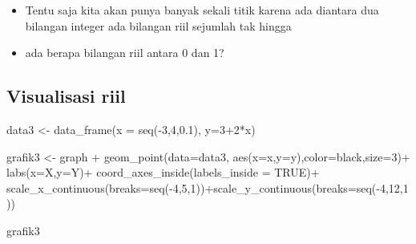 \documentclass[
  letterpaper,
  DIV=11,
  numbers=noendperiod]{scrartcl}
\newenvironment{Shaded}{\begin{snugshade}}{\end{snugshade}}
\newcommand{\AttributeTok}[1]{\textcolor[rgb]{0.40,0.45,0.13}{#1}}
\newcommand{\ConstantTok}[1]{\textcolor[rgb]{0.56,0.35,0.01}{#1}}
\newcommand{\DecValTok}[1]{\textcolor[rgb]{0.68,0.00,0.00}{#1}}
\newcommand{\FloatTok}[1]{\textcolor[rgb]{0.68,0.00,0.00}{#1}}
\newcommand{\FunctionTok}[1]{\textcolor[rgb]{0.28,0.35,0.67}{#1}}
\newcommand{\NormalTok}[1]{\textcolor[rgb]{0.00,0.23,0.31}{#1}}
\newcommand{\OtherTok}[1]{\textcolor[rgb]{0.00,0.23,0.31}{#1}}
\newcommand{\SpecialCharTok}[1]{\textcolor[rgb]{0.37,0.37,0.37}{#1}}
\newcommand{\StringTok}[1]{\textcolor[rgb]{0.13,0.47,0.30}{#1}}
\begin{document}
\begin{itemize}
\item
  Tentu saja kita akan punya banyak sekali titik karena ada diantara dua
  bilangan integer ada bilangan riil sejumlah tak hingga
\item
  ada berapa bilangan riil antara 0 dan 1?
\end{itemize}

\subsection{Visualisasi riil}\label{visualisasi-riil-1}

\begin{Shaded}
\begin{Highlighting}[]
\NormalTok{data3 }\OtherTok{\textless{}{-}} \FunctionTok{data\_frame}\NormalTok{(}\AttributeTok{x =} \FunctionTok{seq}\NormalTok{(}\SpecialCharTok{{-}}\DecValTok{3}\NormalTok{,}\DecValTok{4}\NormalTok{,}\FloatTok{0.1}\NormalTok{),}
                    \AttributeTok{y=}\DecValTok{3}\SpecialCharTok{+}\DecValTok{2}\SpecialCharTok{*}\NormalTok{x)}
                          
\NormalTok{grafik3 }\OtherTok{\textless{}{-}}\NormalTok{ graph }\SpecialCharTok{+}
  \FunctionTok{geom\_point}\NormalTok{(}\AttributeTok{data=}\NormalTok{data3,}
             \FunctionTok{aes}\NormalTok{(}\AttributeTok{x=}\NormalTok{x,}\AttributeTok{y=}\NormalTok{y),}\AttributeTok{color=}\StringTok{\textquotesingle{}black\textquotesingle{}}\NormalTok{,}\AttributeTok{size=}\DecValTok{3}\NormalTok{)}\SpecialCharTok{+}
  \FunctionTok{labs}\NormalTok{(}\AttributeTok{x=}\StringTok{\textquotesingle{}X\textquotesingle{}}\NormalTok{,}\AttributeTok{y=}\StringTok{\textquotesingle{}Y\textquotesingle{}}\NormalTok{)}\SpecialCharTok{+}
  \FunctionTok{coord\_axes\_inside}\NormalTok{(}\AttributeTok{labels\_inside =} \ConstantTok{TRUE}\NormalTok{)}\SpecialCharTok{+}
  \FunctionTok{scale\_x\_continuous}\NormalTok{(}\AttributeTok{breaks=}\FunctionTok{seq}\NormalTok{(}\SpecialCharTok{{-}}\DecValTok{4}\NormalTok{,}\DecValTok{5}\NormalTok{,}\DecValTok{1}\NormalTok{))}\SpecialCharTok{+}\FunctionTok{scale\_y\_continuous}\NormalTok{(}\AttributeTok{breaks=}\FunctionTok{seq}\NormalTok{(}\SpecialCharTok{{-}}\DecValTok{4}\NormalTok{,}\DecValTok{12}\NormalTok{,}\DecValTok{1}\NormalTok{))}

\NormalTok{grafik3}
\end{Highlighting}
\end{Shaded}
\end{document}
